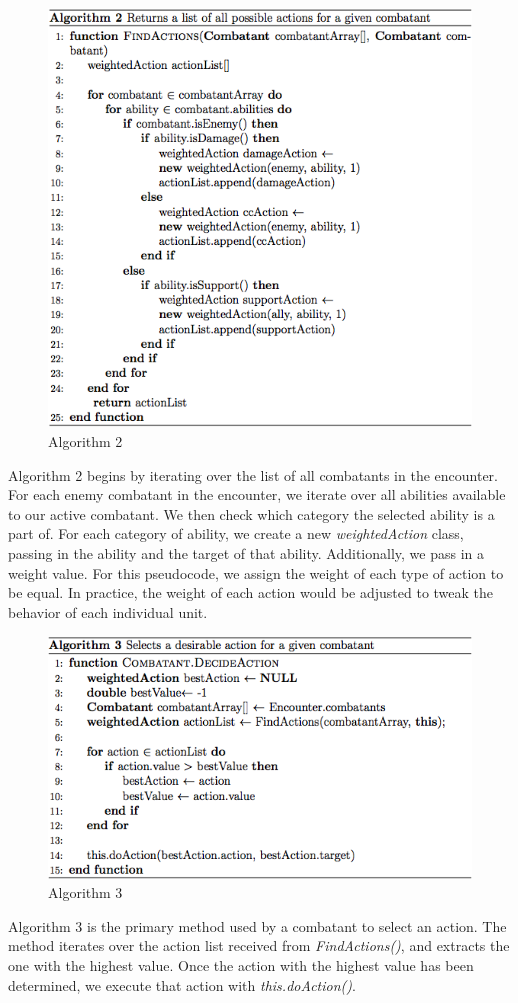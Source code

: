 \documentclass[letterpaper, 10 pt, conference]{ieeeconf}
\begin{document}
\begin{figure}[H]
	\centering
	\centerline{\includegraphics[scale=.37]{algorithm_2}}
	\caption{Algorithm 2}
	\label{fig: Algorithm 2}
\end{figure}
Algorithm 2 begins by iterating over the list of all combatants in the encounter.
For each enemy combatant in the encounter, we iterate over all abilities available
to our active combatant. We then check which category the selected ability is
a part of. For each category of ability, we create a new \textit{weightedAction} class,
passing in the ability and the target of that ability. Additionally, we pass in a
weight value. For this pseudocode, we assign the weight of each type of action to
be equal. In practice, the weight of each action would be adjusted to tweak the
behavior of each individual unit.

\begin{figure}[H]
	\centering
	\centerline{\includegraphics[scale=.37]{algorithm_3}}
	\caption{Algorithm 3}
	\label{fig: Algorithm 3}
\end{figure}
Algorithm 3 is the primary method used by a combatant to select an action.
The method iterates over the action list received from \textit{FindActions()}, and extracts
the one with the highest value. Once the action with the highest value has
been determined, we execute that action with \textit{this.doAction()}.
\end{document}
